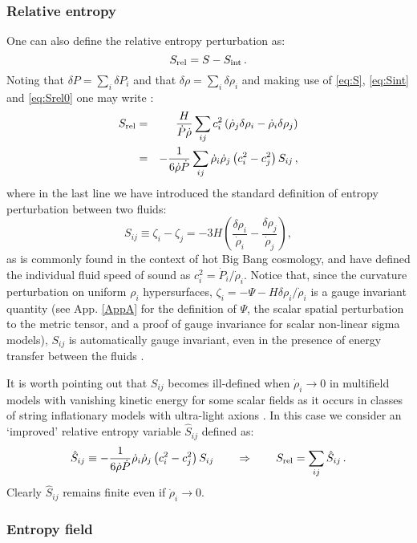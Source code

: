 \documentclass[a4paper,11pt]{article}
\def\be{\begin{equation}}
\def\ee{\end{equation}}
\def\bea{\begin{eqnarray}}
\def\eea{\end{eqnarray}}
\begin{document}
\subsubsection*{Relative entropy}

One can also define the relative entropy perturbation as:
\be
S_{\rm rel}=S-S_{\rm int}\,.
\ee
Noting that $\delta P= \sum_i \delta P_i$ and that $\delta \rho= \sum_i \delta \rho_i$ and making use of \eqref{eq:S}, \eqref{eq:Sint} and \eqref{eq:Srel0} one may write \cite{Malik:2004tf}:
\bea
S_{\rm rel}&=& \frac{H}{\dot{P} \dot{\rho}}\sum_{ij}c^2_i \left(\dot{\rho}_j \delta \rho_i-\dot{\rho}_i \delta \rho_j\right) \nonumber \\
&=&-\frac{1}{6 \dot{\rho}\dot{P}}\sum_{ij} \dot{\rho}_i \dot{\rho}_j \left(c_i^2-c_j^2\right)S_{ij} \,,
\label{eq:Sreldef}
\eea
where in the last line we have introduced the standard definition of entropy perturbation between two fluids:
\be
S_{ij}\equiv\zeta_i-\zeta_j=-3 H \left(\frac{\delta \rho_i}{\dot{\rho}_i}-\frac{\delta \rho_j}{\dot{\rho}_j}\right),
\label{eq:Sab}
\ee
as is commonly found in the context of hot Big Bang cosmology, and have defined the individual fluid speed of sound as $c_i^2=\dot{P}_i/\dot{\rho}_i$. Notice that, since the curvature perturbation on uniform $\rho_i$ hypersurfaces, $\zeta_i=-\Psi-H \delta\rho_i/\dot{\rho}_i$ is a gauge invariant quantity (see App. \ref{AppA} for the definition of $\Psi$, the scalar spatial perturbation to the metric tensor, and a proof of gauge invariance for scalar non-linear sigma models), $S_{ij}$ is automatically gauge invariant, even in the presence of energy transfer between the fluids \cite{Malik:2002jb,Malik:2004tf}.

It is worth pointing out that $S_{ij}$ becomes ill-defined when $\dot\rho_i\to 0$ in multifield models with vanishing kinetic energy for some scalar fields \cite{Wands:2000dp} as it occurs in classes of string inflationary models with ultra-light axions \cite{Cicoli:2018ccr, Cicoli:2019ulk}. In this case we consider an `improved' relative entropy variable $\hat{S}_{ij}$ defined as:
\be
\hat{S}_{ij} \equiv -\frac{1}{6 \dot{\rho}\dot{P}} \dot{\rho}_i \dot{\rho}_j \left(c_i^2-c_j^2\right)S_{ij}\qquad \Rightarrow\qquad S_{\rm rel} = \sum_{ij}\hat{S}_{ij}\,.
\label{hatSij}
\ee
Clearly $\hat{S}_{ij}$ remains finite even if $\dot\rho_i\to 0$. 

\subsubsection*{Entropy field}
\end{document}

